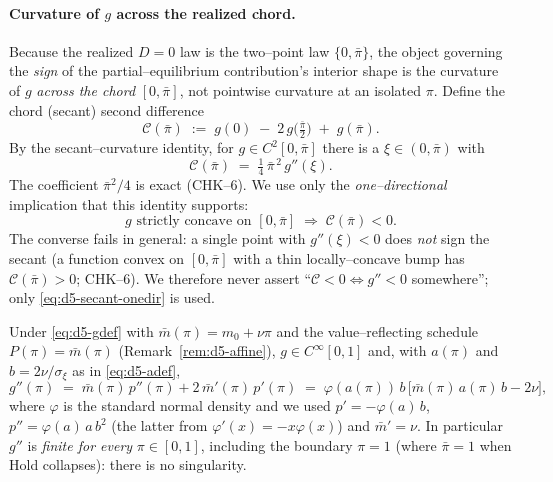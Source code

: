 \paragraph{Curvature of $g$ across the realized chord.}
Because the realized $D=0$ law is the two--point law $\{0,\bar\pi\}$, the object
governing the \emph{sign} of the partial--equilibrium contribution's interior
shape is the curvature of $g$ \emph{across the chord} $[0,\bar\pi]$, not
pointwise curvature at an isolated $\pi$. Define the chord (secant) second
difference
\begin{equation}\label{eq:d5-chord}
  \mathcal C(\bar\pi)\;:=\;g(0)\;-\;2\,g\!\big(\tfrac{\bar\pi}{2}\big)\;+\;g(\bar\pi).
\end{equation}
By the secant--curvature identity, for $g\in C^2[0,\bar\pi]$ there is a
$\xi\in(0,\bar\pi)$ with
\begin{equation}\label{eq:d5-secant}
  \mathcal C(\bar\pi)\;=\;\tfrac14\,\bar\pi^{\,2}\,g''(\xi).
\end{equation}
The coefficient $\bar\pi^{2}/4$ is exact (CHK--6). We use only the
\emph{one--directional} implication that this identity supports:
\begin{equation}\label{eq:d5-secant-onedir}
  g\text{ strictly concave on }[0,\bar\pi]
  \;\Longrightarrow\;
  \mathcal C(\bar\pi)<0 .
\end{equation}
The converse fails in general: a single point with $g''(\xi)<0$ does \emph{not}
sign the secant (a function convex on $[0,\bar\pi]$ with a thin locally--concave
bump has $\mathcal C(\bar\pi)>0$; CHK--6). We therefore never assert
``$\mathcal C<0\iff g''<0$ somewhere''; only \eqref{eq:d5-secant-onedir} is used.

\begin{lemma}\label{lem:d5-chord}
Under \eqref{eq:d5-gdef} with $\bar m(\pi)=m_0+\nu\pi$ and the value--reflecting
schedule $P(\pi)=\bar m(\pi)$ (Remark~\ref{rem:d5-affine}),
$g\in C^\infty[0,1]$ and, with $a(\pi)$ and $b=2\nu/\sigma_\xi$ as in
\eqref{eq:d5-adef},
\begin{equation}\label{eq:d5-gpp}
  g''(\pi)\;=\;\bar m(\pi)\,p''(\pi)+2\,\bar m'(\pi)\,p'(\pi)
            \;=\;\varphi(a(\pi))\,b\,\Big[\bar m(\pi)\,a(\pi)\,b-2\nu\Big],
\end{equation}
where $\varphi$ is the standard normal density and we used $p'=-\varphi(a)\,b$,
$p''=\varphi(a)\,a\,b^{2}$ (the latter from $\varphi'(x)=-x\varphi(x)$) and
$\bar m'=\nu$. In particular $g''$ is \emph{finite for every} $\pi\in[0,1]$,
including the boundary $\pi=1$ (where $\bar\pi=1$ when Hold collapses): there is
no singularity. %
\end{lemma}

